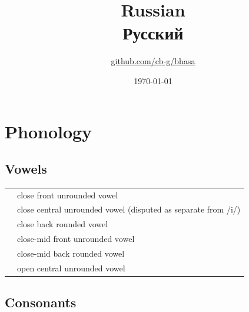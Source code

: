 \documentclass{article}
\title{Russian\\{\cyrillicfont Русский}\\\ipa{["rusk\super jij j@"zik]}}
\author{\href{https://github.com/cb-g/bhasa}{github.com/cb-g/bhasa}}
\date{\today}
\begin{document}
\pagecolor{custom_bg}\color{custom_fg}
\maketitle\thispagestyle{empty}

\newpage\setcounter{page}{1}\section{Phonology}

\subsection{Vowels}

\begin{xltabular}{\textwidth}{lL}
   & close front unrounded vowel \\
   & close central unrounded vowel (disputed as separate from /i/) \\
   & close back rounded vowel \\
   & close-mid front unrounded vowel \\
   & close-mid back rounded vowel \\
   & open central unrounded vowel \\
\end{xltabular}

\subsection{Consonants}
\end{document}
